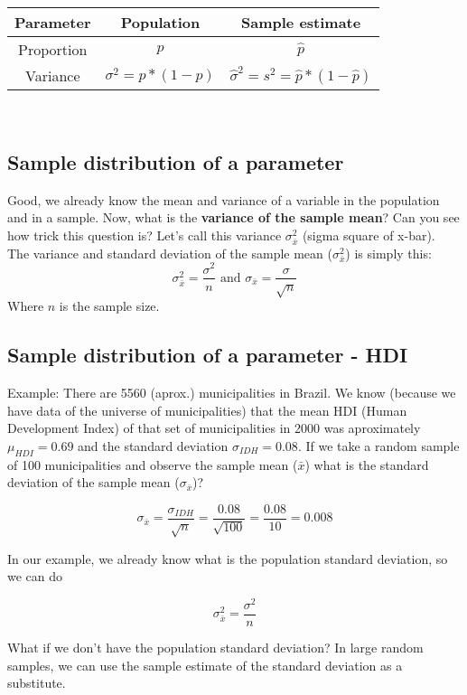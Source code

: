 \documentclass[11pt]{article}
\begin{document}
\begin{tabular}{|c|c|c|}
\hline
	Parameter & Population & Sample estimate\\ 
\hline
	Proportion & $p$ & $\hat{p}$\\
	Variance & $\sigma^2 = p*(1-p)$ & $\hat{\sigma}^2 = s^2 = \hat{p}*(1-\hat{p})$\\
\hline
\end{tabular}
\newline\\



	\subsection*{Sample distribution of a parameter}

Good, we already know the mean and variance of a variable in the population and in a sample. Now, what is the \textbf{variance of the sample mean}? Can you see how trick this question is? Let's call this variance $\sigma_{\bar{x}}^2$ (sigma square of x-bar).\\
	
	The variance and standard deviation of the sample mean ($\sigma_{\bar{x}}^2$) is simply this:
\[\sigma_{\bar{x}}^2 = \frac{\sigma^2}{n} \text{ and }\sigma_{\bar{x}} = \frac{\sigma}{\sqrt{n}}\]
Where $n$ is the sample size.

	\subsection*{Sample distribution of a parameter - HDI}

Example: There are 5560 (aprox.) municipalities in Brazil. We know (because we have data of the universe of municipalities) that the mean HDI (Human Development Index) of that set of municipalities in 2000 was aproximately $\mu_{HDI}=0.69$ and the standard deviation $\sigma_{IDH} = 0.08$. If we take a random sample of 100 municipalities and observe the sample mean ($\bar{x}$) what is the standard deviation of the sample mean ($\sigma_{\bar{x}}$)?

\[\sigma_{\bar{x}} = \frac{\sigma_{IDH}}{\sqrt{n}} = \frac{0.08}{\sqrt{100}} = \frac{0.08}{10} = 0.008\]

In our example, we already know what is the population standard deviation, so we can do

\[\sigma_{\bar{x}}^2 = \frac{\sigma^2}{n}\]

What if we don't have the population standard deviation? In large random samples, we can use the sample estimate of the standard deviation as a substitute.
\end{document}
